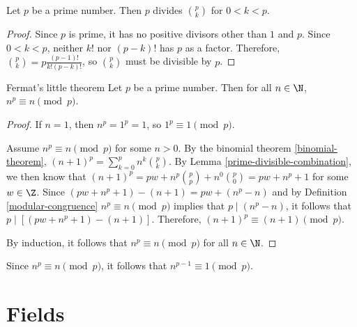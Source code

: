 \documentclass[12pt]{article}
\begin{document}
\begin{lemma}\label{prime-divisible-combination}
    Let $p$ be a prime number. Then $p$ divides ${p \choose k}$ for $0 < k < p$.
\end{lemma}

\begin{proof}
    Since $p$ is prime, it has no positive divisors other than $1$ and $p$. Since $0 < k < p$, neither $k!$ nor $(p-k)!$ has $p$ as a factor. Therefore, ${p \choose k} = p\frac{(p-1)!}{k!(p-k)!}$, so $p \choose k$ must be divisible by $p$.
\end{proof}

\begin{thm}{Fermat's little theorem}\label{fermat-little-theorem}\proofbreak
    Let $p$ be a prime number. Then for all $n \in \N$, $n^p \equiv n \pmod p$.
\end{thm}

\begin{proof}
    If $n = 1$, then $n^p = 1^p = 1$, so $1^p \equiv 1 \pmod p$.

    Assume $n^p \equiv n \pmod p$ for some $n > 0$. By the binomial theorem \ref{binomial-theorem}, $(n+1)^p = \sum_{k=0}^pn^k{p \choose k}$. By Lemma \ref{prime-divisible-combination}, we then know that $(n+1)^p = pw + n^p{p \choose p} + n^0{p \choose 0} = pw + n^p + 1$ for some $w \in \Z$. Since $(pw + n^p + 1) - (n + 1) = pw + (n^p - n)$ and by Definition \ref{modular-congruence} $n^p \equiv n \pmod p$ implies that $p \mid (n^p - n)$, it follows that $p \mid \left[(pw + n^p + 1) - (n + 1)\right]$. Therefore, $(n+1)^p \equiv (n+1) \pmod p$.

    By induction, it follows that $n^p \equiv n \pmod p$ for all $n \in \N$.
\end{proof}

\begin{cor}\label{fermat-little-corallary}
    Since $n^p \equiv n \pmod p$, it follows that $n^{p-1} \equiv 1 \pmod p$.
\end{cor}

\section{Fields}
\end{document}
